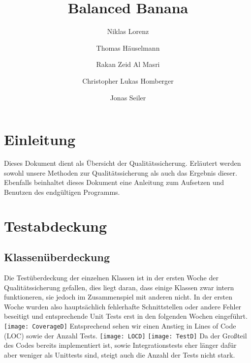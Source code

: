\documentclass[a4paper,12pt]{article}
\title{Balanced Banana}
\author{Niklas Lorenz \and Thomas Häuselmann \and Rakan Zeid Al Masri \and Christopher Lukas Homberger \and Jonas Seiler}
\begin{document}
\setcounter{page}{2}
\tableofcontents          %
\clearpage
{}

\section{Einleitung}
\vspace{0.2cm}
Dieses Dokument dient als Übersicht der Qualitätssicherung. Erläutert werden sowohl unsere Methoden zur Qualitätssicherung als auch das Ergebnis dieser. Ebenfalls beinhaltet dieses Dokument eine Anleitung zum Aufsetzen und Benutzen des endgültigen Programms.
\clearpage
\section{Testabdeckung}
\subsection{Klassenüberdeckung}
\vspace{0.2cm}
Die Testüberdeckung der einzelnen Klassen ist in der ersten Woche der Qualitätssicherung gefallen, dies liegt daran, dass einige Klassen zwar intern funktioneren, sie jedoch im Zusammenspiel mit anderen nicht. In der ersten Woche wurden also hauptsächlich fehlerhafte Schnittstellen oder andere Fehler beseitigt und entsprechende Unit Tests erst in den folgenden Wochen eingeführt. \newline
\texttt{[image: CoverageD]} \newline
Entsprechend sehen wir einen Anstieg in Lines of Code (LOC) sowie der Anzahl Tests.
\texttt{[image: LOCD]} \newline
\texttt{[image: TestD]} \newline
Da der Großteil des Codes bereits implementiert ist, sowie Integrationstests eher länger dafür aber weniger als Unittests sind, steigt auch die Anzahl der Tests nicht stark.
\clearpage
\end{document}
